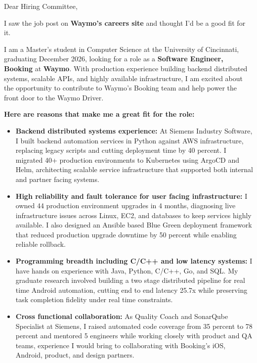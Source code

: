 \documentclass[11pt]{letter}
\date{}
\begin{document}
\begin{letter}{}

\opening{Dear Hiring Committee,}

I saw the job post on \textbf{Waymo's careers site} and thought I'd be a good fit for it.

I am a Master's student in Computer Science at the University of Cincinnati, graduating December 2026, looking for a role as a \textbf{Software Engineer, Booking} at \textbf{Waymo}. With production experience building backend distributed systems, scalable APIs, and highly available infrastructure, I am excited about the opportunity to contribute to Waymo's Booking team and help power the front door to the Waymo Driver.

\textbf{Here are reasons that make me a great fit for the role:}

\begin{itemize}[leftmargin=*, itemsep=0.45em]
    \item \textbf{Backend distributed systems experience:} At Siemens Industry Software, I built backend automation services in Python against AWS infrastructure, replacing legacy scripts and cutting deployment time by 40 percent. I migrated 40+ production environments to Kubernetes using ArgoCD and Helm, architecting scalable service infrastructure that supported both internal and partner facing systems.

    \item \textbf{High reliability and fault tolerance for user facing infrastructure:} I owned 44 production environment upgrades in 4 months, diagnosing live infrastructure issues across Linux, EC2, and databases to keep services highly available. I also designed an Ansible based Blue Green deployment framework that reduced production upgrade downtime by 50 percent while enabling reliable rollback.

    \item \textbf{Programming breadth including C/C++ and low latency systems:} I have hands on experience with Java, Python, C/C++, Go, and SQL. My graduate research involved building a two stage distributed pipeline for real time Android automation, cutting end to end latency 25.7x while preserving task completion fidelity under real time constraints.

    \item \textbf{Cross functional collaboration:} As Quality Coach and SonarQube Specialist at Siemens, I raised automated code coverage from 35 percent to 78 percent and mentored 5 engineers while working closely with product and QA teams, experience I would bring to collaborating with Booking's iOS, Android, product, and design partners.
\end{itemize}


\end{letter}
\end{document}
